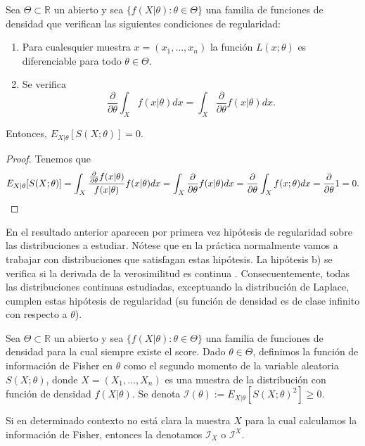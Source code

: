     \begin{lem} \label{lem:score:esp}
        Sea $\Theta \subset \mathbb{R}$ un abierto y sea $\{f(X|\theta): \theta \in \Theta\}$ una familia de funciones de densidad que verifican las siguientes condiciones de regularidad:
        \begin{enumerate}
            \item Para cualesquier muestra $x=(x_1, \ldots, x_n)$ la función $L(x; \theta)$ es diferenciable para todo $\theta \in \Theta$.
            \item Se verifica
            \[\frac{\partial}{\partial \theta}\int_{X} f(x| \theta) dx = \int_{X} \frac{\partial}{\partial \theta} f(x| \theta) dx.\]
        \end{enumerate}
        Entonces, $E_{X|\theta}[S(X;\theta)] = 0$.
    \end{lem}
    \begin{proof}
        Tenemos que
        \[E_{X|\theta}[S(X;\theta)] = \int_{X} \frac{\frac{\partial}{\partial \theta} f(x | \theta)}{f(x | \theta)}  f(x | \theta) dx = \int_{X} \frac{\partial}{\partial \theta} f(x | \theta) dx = \frac{\partial}{\partial \theta} \int_{X} f(x; \theta) dx = \frac{\partial}{\partial \theta} 1 = 0. \qedhere\]
    \end{proof}

    En el resultado anterior aparecen por primera vez hipótesis de regularidad sobre las distribuciones a estudiar. Nótese que en la práctica normalmente vamos a trabajar con distribuciones que satisfagan estas hipótesis. La hipótesis b) se verifica si la derivada de la verosimilitud es continua \cite{leibniz}. Consecuentemente, todas las distribuciones continuas estudiadas, exceptuando la distribución de Laplace, cumplen estas hipótesis de regularidad (su función de densidad es de clase infinito con respecto a $\theta$).

    \begin{definition}
        Sea $\Theta \subset \mathbb{R}$ un abierto y sea $\{f(X|\theta): \theta \in \Theta\}$ una familia de funciones de densidad para la cual siempre existe el score. Dado $\theta \in \Theta$, definimos la función de información de Fisher en $\theta$ como el segundo momento de la variable aleatoria $S(X;\theta)$, donde $X = (X_1, \ldots, X_n)$ es una muestra de la distribución con función de densidad $f(X|\theta)$. Se denota $\mathcal{I}(\theta) := E_{X|\theta}[S(X;\theta)^2] \ge 0.$
    \end{definition}

    Si en determinado contexto no está clara la muestra $X$ para la cual calculamos la información de Fisher, entonces la denotamos $\mathcal{I}_X$ o $\mathcal{I}^X$.

